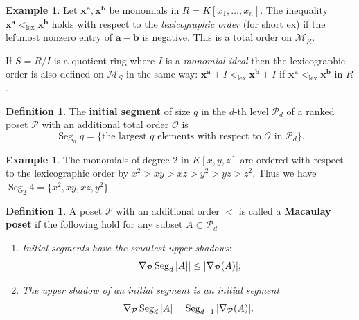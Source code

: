 \documentclass[11pt]{amsart}
\newcommand{\ba}{{\mathbf a}}
\newcommand{\bb}{{\mathbf b}}
\newcommand{\bx}{{\mathbf x}}
\newcommand{\M}{{\mathcal M}}
\renewcommand{\O}{{\mathcal O}}
\renewcommand{\P}{{\mathcal P}}
\def\Seg{\operatorname{Seg}}
\newcommand{\uSdw}{\rotatebox[origin=c]{180}{$\Delta$}}
\def\lex{\operatorname{lex}}
\theoremstyle{plain} %
\theoremstyle{definition}
\newtheorem{defn}[thm]{Definition}
\newtheorem{ex}[thm]{Example}
\theoremstyle{remark}
\numberwithin{equation}{section}  %
\begin{document}
\begin{ex}\label{ex: lex}
Let $\bx^\ba ,\bx^\bb$ be monomials in $R=K[x_1,\ldots,x_n]$. The inequality $\bx^\ba <_{\lex} \bx^\bb$ holds with respect to the {\em lexicographic order} (for short ex) if  the leftmost nonzero entry of $\ba-\bb$ is negative. This is a total order on $\M_R$. 

If $S=R/I$ is a quotient ring where $I$ is a {\em monomial ideal} then the lexicographic order is also defined on $\M_S$ in the same way: $\bx^\ba +I <_{\lex} \bx^\bb +I $ if $\bx^\ba <_{\lex} \bx^\bb$ in $R$.
\end{ex}



\begin{tcolorbox}
\begin{defn}
The {\bf initial segment} of size $q$ in the $d$-th level $\P_d$ of a ranked  poset $\P$ with an additional total order $\O$ is 
\[
\Seg_d q= \{ \text{the largest } q \text{ elements with respect to } \O  \text{ in } \P_d \}.
\]
\end{defn}
\end{tcolorbox}
\begin{ex}
The monomials of degree 2 in $K[x,y,z]$ are ordered with respect to the lexicographic order by
$x^2>xy>xz>y^2>yz>z^2$. Thus we have $\Seg_2 4=\{x^2, xy, xz, y^2\}$.
\end{ex}




\begin{tcolorbox}
\begin{defn}
A poset $\P$ with an additional order $<$ is called a {\bf Macaulay poset} if the following hold for any subset $A\subset \P_d$ 
\begin{enumerate}
\item {\em Initial segments have the smallest upper shadows}: 
\[
\left | \uSdw_\P\Seg_d |A|  \right | \leq  |\uSdw_\P(A)|;
\]
\item {\em The upper shadow of an initial segment is an initial segment}
\[
 \uSdw_\P  \Seg_d |A| =\Seg_{d-1} |\uSdw_\P(A)|.
\]
\end{enumerate}
\end{defn}
\end{tcolorbox}
\end{document}
